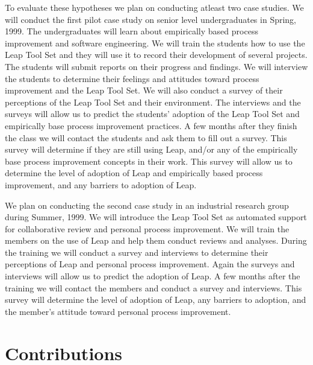 To evaluate these hypotheses we plan on conducting atleast two case
studies.  We will conduct the first pilot case study on senior level
undergraduates in Spring, 1999.  The undergraduates will learn about
empirically based process improvement and software engineering.  We will
train the students how to use the Leap Tool Set and they will use it to
record their development of several projects.  The students will submit
reports on their progress and findings.  We will interview the students to
determine their feelings and attitudes toward process improvement and the
Leap Tool Set.  We will also conduct a survey of their perceptions of the
Leap Tool Set and their environment.  The interviews and the surveys will
allow us to predict the students' adoption of the Leap Tool Set and
empirically base process improvement practices.  A few months after they
finish the class we will contact the students and ask them to fill out a
survey.  This survey will determine if they are still using Leap, and/or
any of the empirically base process improvement concepts in their work.
This survey will allow us to determine the level of adoption of Leap and
empirically based process improvement, and any barriers to adoption of
Leap.

We plan on conducting the second case study in an industrial research group
during Summer, 1999.  We will introduce the Leap Tool Set as automated
support for collaborative review and personal process improvement.  We will
train the members on the use of Leap and help them conduct reviews and
analyses.  During the training we will conduct a survey and interviews to
determine their perceptions of Leap and personal process improvement.
Again the surveys and interviews will allow us to predict the adoption of
Leap.  A few months after the training we will contact the members and
conduct a survey and interviews.  This survey will determine the level of
adoption of Leap, any barriers to adoption, and the member's attitude
toward personal process improvement.


\section*{Contributions}

